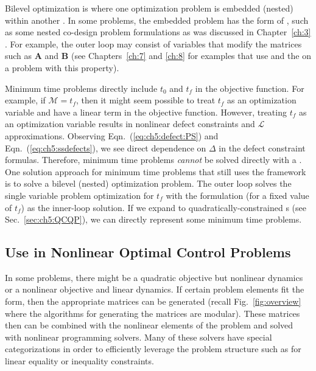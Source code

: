 Bilevel optimization is where one optimization problem is embedded (nested) within another \cite{Colson2007a}.
In some problems, the embedded problem has the form of \lqdo, such as some nested co-design problem formulations as was discussed in Chapter~\ref{ch:3} \cite{Herber2017b, Chilan2017a}.
For example, the outer loop may consist of variables that modify the matrices such as $\bm{A}$ and $\bm{B}$ (see Chapters~\ref{ch:7} and \ref{ch:8} for examples that use \lqdo{} and the \apgp{} on a problem with this property).

Minimum time problems directly include $t_0$ and $t_f$ in the objective function.
For example, if $\mathcal{M} = t_f$, then it might seem possible to treat $t_f$ as an optimization variable and have a linear term in the objective function.
However, treating $t_f$ as an optimization variable results in nonlinear defect constraints and $\mathcal{L}$ approximations.
Observing Eqn.~(\ref{eq:ch5:defect:PS}) and Eqn.~(\ref{eq:ch5:ssdefects}), we see direct dependence on $\Delta$ in the defect constraint formulas.
Therefore, minimum time problems \textit{cannot} be solved directly with a \qp.
One solution approach for minimum time problems that still uses the \lqdo{} framework is to solve a bilevel (nested) optimization problem.
The outer loop solves the single variable problem optimization for $t_f$ with the \qp{} formulation (for a fixed value of $t_f$) as the inner-loop solution.
If we expand to quadratically-constrained {\qp}s (see Sec.~\ref{sec:ch5:QCQP}), we can directly represent some minimum time problems.

\subsection{Use in Nonlinear Optimal Control Problems}

In some problems, there might be a quadratic objective but nonlinear dynamics or a nonlinear objective and linear dynamics.
If certain problem elements fit the \lqdo{} form, then the appropriate matrices can be generated (recall Fig.~\ref{fig:overview} where the algorithms for generating the \qp{} matrices are modular).
These matrices then can be combined with the nonlinear elements of the problem and solved with nonlinear programming solvers.
Many of these solvers have special categorizations in order to efficiently leverage the problem structure such as for linear equality or inequality constraints.